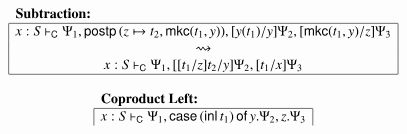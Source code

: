 \documentclass{lmcs}
\newcommand{\DualLNLLogicnt}[1]{\mathit{#1}}
\newcommand{\DualLNLLogicmv}[1]{\mathit{#1}}
\newcommand{\DualLNLLogicsym}[1]{#1}
\begin{document}
\begin{figure}
  \begin{mdframed}    
  \begin{center}
  \begin{math}
    \begin{array}{c}
      \begin{array}{|c|}
        \multicolumn{1}{l}{\textbf{Subtraction:}}\\
        \hline
             \DualLNLLogicmv{x}  :  \DualLNLLogicnt{S}  \vdash_{\mathsf{C} }  \Psi_{{\mathrm{1}}}  \DualLNLLogicsym{,}    \mathsf{postp}\,( \DualLNLLogicmv{z}  \mapsto  \DualLNLLogicnt{t_{{\mathrm{2}}}} ,   \mathsf{mkc}( \DualLNLLogicnt{t_{{\mathrm{1}}}} , \DualLNLLogicmv{y} )  )    \DualLNLLogicsym{,}  \DualLNLLogicsym{[}  \DualLNLLogicmv{y}  \DualLNLLogicsym{(}  \DualLNLLogicnt{t_{{\mathrm{1}}}}  \DualLNLLogicsym{)}  \DualLNLLogicsym{/}  \DualLNLLogicmv{y}  \DualLNLLogicsym{]}  \Psi_{{\mathrm{2}}}  \DualLNLLogicsym{,}  \DualLNLLogicsym{[}   \mathsf{mkc}( \DualLNLLogicnt{t_{{\mathrm{1}}}} , \DualLNLLogicmv{y} )   \DualLNLLogicsym{/}  \DualLNLLogicmv{z}  \DualLNLLogicsym{]}  \Psi_{{\mathrm{3}}} \\
            \rightsquigarrow\\
                 \DualLNLLogicmv{x}  :  \DualLNLLogicnt{S}  \vdash_{\mathsf{C} }  \Psi_{{\mathrm{1}}}  \DualLNLLogicsym{,}  \DualLNLLogicsym{[}  \DualLNLLogicsym{[}  \DualLNLLogicnt{t_{{\mathrm{1}}}}  \DualLNLLogicsym{/}  \DualLNLLogicmv{z}  \DualLNLLogicsym{]}  \DualLNLLogicnt{t_{{\mathrm{2}}}}  \DualLNLLogicsym{/}  \DualLNLLogicmv{y}  \DualLNLLogicsym{]}  \Psi_{{\mathrm{2}}}  \DualLNLLogicsym{,}  \DualLNLLogicsym{[}  \DualLNLLogicnt{t_{{\mathrm{1}}}}  \DualLNLLogicsym{/}  \DualLNLLogicmv{x}  \DualLNLLogicsym{]}  \Psi_{{\mathrm{3}}} \\
                \hline
      \end{array}\\
      \\
      \begin{array}{lll}
        \begin{array}{|c|}
          \multicolumn{1}{l}{\textbf{Coproduct Left:}}\\
          \hline
               \DualLNLLogicmv{x}  :  \DualLNLLogicnt{S}  \vdash_{\mathsf{C} }  \Psi_{{\mathrm{1}}}  \DualLNLLogicsym{,}   \mathsf{case}\, \DualLNLLogicsym{(}   \mathsf{inl}\, \DualLNLLogicnt{t_{{\mathrm{1}}}}   \DualLNLLogicsym{)} \,\mathsf{of}\, \DualLNLLogicmv{y} . \Psi_{{\mathrm{2}}} ,  \DualLNLLogicmv{z} . \Psi_{{\mathrm{3}}}  \\

\end{array}
\end{array}
\end{array}
\end{math}
\end{center}
\end{mdframed}
\end{figure}
\end{document}
